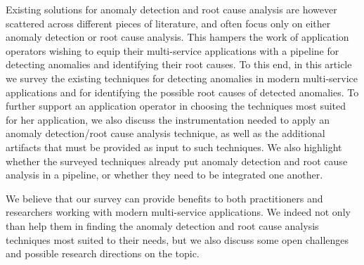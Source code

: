 Existing solutions for anomaly detection and root cause analysis are however scattered across different pieces of literature, and often focus only on either anomaly detection or root cause analysis.
This hampers the work of application operators wishing to equip their multi-service applications with a pipeline for detecting anomalies and identifying their root causes.
To this end, in this article we survey the existing techniques for detecting anomalies in modern multi-service applications and for identifying the possible root causes of detected anomalies.
To further support an application operator in choosing the techniques most suited for her application, we also discuss the instrumentation needed to apply an anomaly detection/root cause analysis technique, as well as the additional artifacts that must be provided as input to such techniques.
We also highlight whether the surveyed techniques already put anomaly detection and root cause analysis in a pipeline, or whether they need to be integrated one another.

We believe that our survey can provide benefits to both practitioners and researchers working with modern multi-service applications.
We indeed not only than help them in finding the anomaly detection and root cause analysis techniques most suited to their needs, but we also discuss some open challenges and possible research directions on the topic. 
